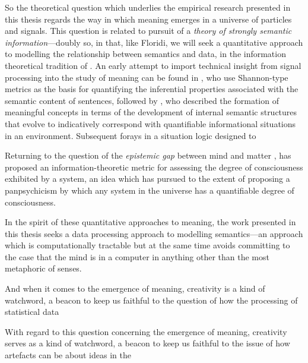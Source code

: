 

So the theoretical question which underlies the empirical research presented in this thesis regards the way in which meaning emerges in a universe of particles and signals.  This question is related to  pursuit of a \emph{theory of strongly semantic information}---doubly so, in that, like Floridi, we will seek a quantitative approach to modelling the relationship between semantics and data, in the information theoretical tradition of \cite{Shannon}.  An early attempt to import technical insight from signal processing into the study of meaning can be found in , who use Shannon-type metrics as the basis for quantifying the inferential properties associated with the semantic content of sentences, followed by \cite{Dretske}, who described the formation of meaningful concepts in terms of the development of internal semantic structures that evolve to indicatively correspond with quantifiable informational situations in an environment.  Subsequent forays in a situation logic designed to 

\cite{BarwiseEA}

Returning to the question of the \emph{epistemic gap} between mind and matter \citep{Levine,Pattee}, \cite{Tonnoni} has proposed an information-theoretic metric for assessing the degree of consciousness exhibited by a system, an idea which \cite{Koch} has pursued to the extent of proposing a panpsychicism by which any system in the universe has a quantifiable degree of consciousness.

In the spirit of these quantitative approaches to meaning, the work presented in this thesis seeks a data processing approach to modelling semantics---an approach which is computationally tractable but at the same time avoids committing to the case that the mind is in a computer in anything other than the most metaphoric of senses.

And when it comes to the emergence of meaning, creativity is a kind of watchword, a beacon to keep us faithful to the question of how the processing of statistical data 

With regard to this question concerning the emergence of meaning, creativity serves as a kind of watchword, a beacon to keep us faithful to the issue of how artefacts can be about ideas in the 

